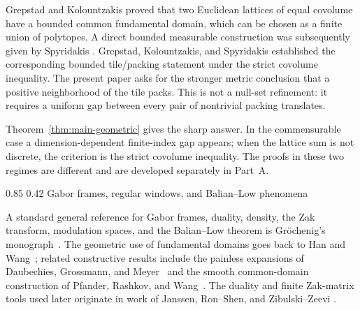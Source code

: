 \documentclass[11pt,reqno]{amsart}
\makeatletter
\numberwithin{equation}{section}
\renewcommand\subsection{\@startsection{subsection}{2}{\z@}%
  {0.85\baselineskip \@plus 0.25\baselineskip \@minus 0.10\baselineskip}%
  {0.42\baselineskip}%
  {\normalfont\bfseries}}
\theoremstyle{definition}
\theoremstyle{remark}
\makeatother
\begin{document}
Grepstad and
Kolountzakis \cite{GrepstadKolountzakis2026} proved that two Euclidean
lattices of equal covolume have a bounded common fundamental domain, which
can be chosen as a finite union of polytopes.  A direct bounded measurable
construction was subsequently given by Spyridakis
\cite{Spyridakis2026BoundedCommon}.  Grepstad, Kolountzakis, and Spyridakis
\cite{GrepstadKolountzakisSpyridakis2025} established the corresponding
bounded tile/packing statement under the strict covolume inequality.  The
present paper asks for the stronger metric conclusion that a positive
neighborhood of the tile packs.  This is not a null-set refinement: it
requires a uniform gap between every pair of nontrivial packing translates.

Theorem~\ref{thm:main-geometric} gives the sharp answer.  In the
commensurable case a dimension-dependent finite-index gap appears; when the
lattice sum is not discrete, the criterion is the strict covolume
inequality.  The proofs in these two regimes are different and are
developed separately in Part~A.

\subsection{Gabor frames, regular windows, and Balian--Low phenomena}
\label{sec:lit-gabor}

A standard general reference for Gabor frames, duality, density, the Zak
transform, modulation spaces, and the Balian--Low theorem is
Gr\"ochenig's monograph~\cite{Grochenig2001}.  The geometric use of
fundamental domains goes back to Han and Wang~\cite{HanWang2001}; related
constructive results include the painless expansions of Daubechies,
Grossmann, and Meyer~\cite{DaubechiesGrossmannMeyer1986} and the smooth
common-domain construction of Pfander, Rashkov, and
Wang~\cite{PfanderRashkovWang2012}.  The duality and finite Zak-matrix tools
used later originate in work of Janssen, Ron--Shen, and Zibulski--Zeevi
\cite{Janssen1995,RonShen1997,ZibulskiZeevi1997}.
\end{document}

